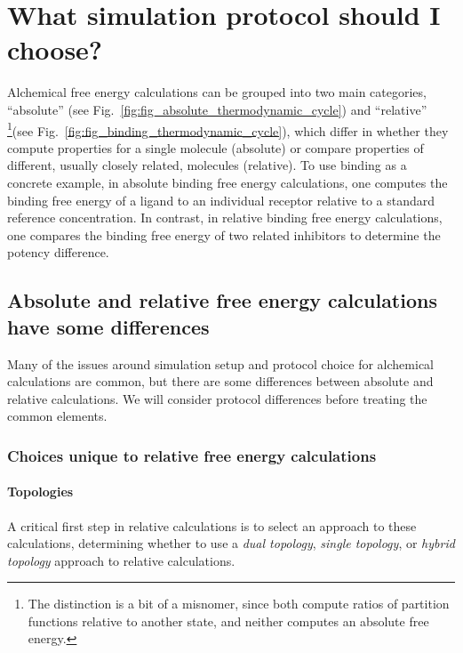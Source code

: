 \documentclass[9pt,bestpractices]{livecoms}
\begin{document}
\section{What simulation protocol should I choose?}
\label{sec:simulation_protocol_choice}
Alchemical free energy calculations can be grouped into two main categories, ``absolute'' (see Fig.~\ref{fig:fig_absolute_thermodynamic_cycle}) and ``relative'' \footnote{The distinction is a bit of a misnomer, since both compute ratios of partition functions relative to another state, and neither computes an absolute free energy.}(see Fig.~\ref{fig:fig_binding_thermodynamic_cycle}), which differ in whether they compute properties for a single molecule (absolute) or compare properties of different, usually closely related, molecules (relative).
To use binding as a concrete example, in absolute binding free energy calculations, one computes the binding free energy of a ligand to an individual receptor relative to a standard reference concentration.
%
In contrast, in relative binding free energy calculations, one compares the binding free energy of two related inhibitors to determine the potency difference.
%
\subsection{Absolute and relative free energy calculations have some differences}
Many of the issues around simulation setup and protocol choice for alchemical calculations are common, but there are some differences between absolute and relative calculations. We will consider protocol differences before treating the common elements.
%
\subsubsection{Choices unique to relative free energy calculations}
\label{sec:relative-fe-protocol}
%
\paragraph{Topologies} 
A critical first step in relative calculations is to select an approach to these calculations, determining whether to use a \emph{dual topology}, \emph{single topology}, or \emph{hybrid topology} approach to relative calculations.
\end{document}
